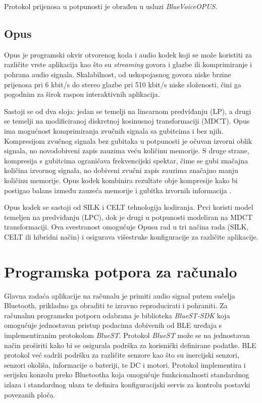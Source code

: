 Protokol prijenosa u potpunosti je obrađen u usluzi \textit{BlueVoiceOPUS}.
\subsection{Opus}
Opus je programski okvir otvorenog koda i audio kodek koji se može koristiti za različite vrste aplikacija kao što su \textit{streaming} govora i glazbe ili komprimiranje i pohrana audio signala. Skalabilnost, od uskopojasnog govora niske brzine prijenosa pri 6 kbit/s do stereo glazbe pri 510 kbit/s niske složenosti, čini ga pogodnim za širok raspon interaktivnih aplikacija.

Sastoji se od dva sloja: jedan se temelji na linearnom predviđanju (LP), a drugi se temelji na modificiranoj diskretnoj kosinusnoj transformaciji (MDCT). Opus ima mogućnost komprimiranja zvučnih signala sa gubitcima i bez njih. Kompresijom zvučnog signala bez gubitaka u potpunosti je očuvan izvorni oblik signala, no novodobiveni zapis zauzima veću količinu memorije. S druge strane, kompresija s gubitcima ograničava frekvencijski spektar, čime se gubi značajna količina izvornog signala, no dobiveni zvučni zapis zauzima značajno manju količinu memorije. Opus kodek kombinira rezultate obje kompresije kako bi postigao balans između zauzeća memorije i gubitka izvornih informacija \cite{opus}. 

Opus kodek se sastoji od SILK i CELT tehnologija kodiranja. Prvi koristi model temeljen na predviđanju (LPC), dok je drugi u potpunosti modeliran na MDCT transformaciji. Ova svestranost omogućuje Opusu rad u tri načina rada (SILK, CELT ili hibridni način) i osigurava višestruke konfiguracije za različite aplikacije.

\section{Programska potpora za računalo}

Glavna zadaća aplikacije na računalu je primiti audio signal putem sučelja Bluetooth, prikladno ga obraditi te izravno reproducirati i pohraniti. Za računalnu programsku potporu odabrana je biblioteka \textit{BlueST-SDK} koja omogućuje jednostavan pristup podacima dobivenih od BLE uređaja s implementiranim protokolom \textit{BlueST}. Protokol \textit{BlueST} može se na jednostavan način proširiti kako bi se osigurala podrška za korisnički definirane podatke. BLE protokol već sadrži podršku za različite senzore kao što su inercijski senzori, senzori okoliša, informacije o bateriji, te DC i motori. Protokol implementira i serijsku konzolu preko Bluetootha koja omogućuje funkcionalnosti standardnog izlaza i standardnog ulaza te definira konfiguracijski servis za kontrolu postavki povezanih ploča. 

